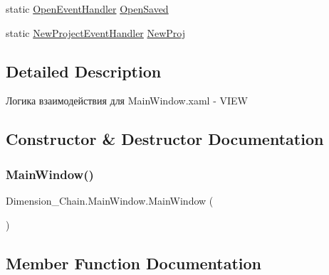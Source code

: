 \begin{DoxyCompactItemize}
\item 
static \mbox{\hyperlink{class_dimension___chain_1_1_main_window_aad640b4de47e0ac6ac018cc8e612a792}{Open\+Event\+Handler}} \mbox{\hyperlink{class_dimension___chain_1_1_main_window_a800583b52dc2b7c26852d45bfab4b73f}{Open\+Saved}}
\item 
static \mbox{\hyperlink{class_dimension___chain_1_1_main_window_a973bbb7ae10c9591b950d4b1b5d9eea3}{New\+Project\+Event\+Handler}} \mbox{\hyperlink{class_dimension___chain_1_1_main_window_adf110c4fad0a5ccd89268bd6ce7f675c}{New\+Proj}}
\end{DoxyCompactItemize}


\subsection{Detailed Description}
Логика взаимодействия для Main\+Window.\+xaml -\/ V\+I\+EW 



\subsection{Constructor \& Destructor Documentation}
\mbox{\label{class_dimension___chain_1_1_main_window_a0ebc5549460f612ea2a5072bf25e5178}} 
\subsubsection{\texorpdfstring{Main\+Window()}{MainWindow()}}
{\footnotesize\ttfamily Dimension\+\_\+\+Chain.\+Main\+Window.\+Main\+Window (\begin{DoxyParamCaption}{ }\end{DoxyParamCaption})}



\subsection{Member Function Documentation}
\mbox{\label{class_dimension___chain_1_1_main_window_a34a91a946df99f170f8961d961a1fa8f}} 
